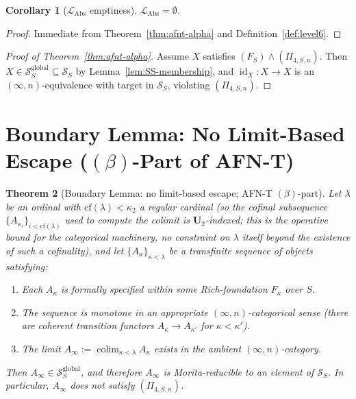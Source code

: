 \documentclass[11pt]{article}
\theoremstyle{plain}
\newtheorem{theorem}{Theorem}[section]
\newtheorem{corollary}[theorem]{Corollary}
\theoremstyle{definition}
\newcommand{\cS}{\mathcal{S}}
\newcommand{\LAbs}{\mathcal{L}_{\mathrm{Abs}}}
\DeclareMathOperator{\colim}{colim}
\DeclareMathOperator{\id}{id}
\begin{document}
\begin{corollary}[$\LAbs$ emptiness]\label{cor:level6-empty-alpha}
$\LAbs = \emptyset$.
\end{corollary}

\begin{proof}
Immediate from Theorem~\ref{thm:afnt-alpha} and Definition~\ref{def:level6}.
\end{proof}

\begin{proof}[Proof of Theorem~\ref{thm:afnt-alpha}]
Assume $X$ satisfies $(F_S) \wedge (\Pi_{4, S, n})$. Then $X \in \cS_S^{\mathrm{global}} \subseteq \cS_S$ by Lemma~\ref{lem:SS-membership}, and $\id_X : X \to X$ is an $(\infty, n)$-equivalence with target in $\cS_S$, violating $(\Pi_{4, S, n})$.
\end{proof}

\section{\texorpdfstring{Boundary Lemma: No Limit-Based Escape ($(\beta)$-Part of AFN-T)}{Boundary Lemma: No Limit-Based Escape ((beta)-Part of AFN-T)}}\label{sec:afnt-beta}

\begin{theorem}[Boundary Lemma: no limit-based escape; AFN-T $(\beta)$-part]\label{thm:afnt-beta}
Let $\lambda$ be an ordinal with $\mathrm{cf}(\lambda) < \kappa_2$ a regular cardinal (so the cofinal subsequence $\{A_{\kappa_i}\}_{i < \mathrm{cf}(\lambda)}$ used to compute the colimit is $\mathbf{U}_2$-indexed; this is the operative bound for the categorical machinery, no constraint on $\lambda$ itself beyond the existence of such a cofinality), and let $\{A_\kappa\}_{\kappa < \lambda}$ be a transfinite sequence of objects satisfying:
\begin{enumerate}[label=(\roman*)]
\item Each $A_\kappa$ is formally specified within some Rich-foundation $F_\kappa$ over $S$.
\item The sequence is monotone in an appropriate $(\infty, n)$-categorical sense (there are coherent transition functors $A_\kappa \to A_{\kappa'}$ for $\kappa < \kappa'$).
\item The limit $A_\infty := \colim_{\kappa < \lambda} A_\kappa$ exists in the ambient $(\infty, n)$-category.
\end{enumerate}
Then $A_\infty \in \cS_S^{\mathrm{global}}$, and therefore $A_\infty$ is Morita-reducible to an element of $\cS_S$. In particular, $A_\infty$ does not satisfy $(\Pi_{4, S, n})$.
\end{theorem}
\end{document}
